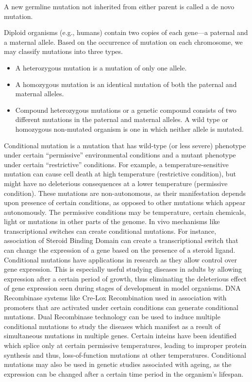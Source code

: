 A new germline mutation not inherited from either parent is called a de novo mutation.

Diploid organisms (e.g., humans) contain two copies of each gene---a paternal and a maternal allele. Based on the occurrence of mutation on each chromosome, we may classify mutations into three types.

\begin{itemize}
\tightlist
\item
  A heterozygous mutation is a mutation of only one allele.
\item
  A homozygous mutation is an identical mutation of both the paternal and maternal alleles.
\item
  Compound heterozygous mutations or a genetic compound consists of two different mutations in the paternal and maternal alleles.
  A wild type or homozygous non-mutated organism is one in which neither allele is mutated.
\end{itemize}

Conditional mutation is a mutation that has wild-type (or less severe) phenotype under certain ``permissive'' environmental conditions and a mutant phenotype under certain ``restrictive'' conditions. For example, a temperature-sensitive mutation can cause cell death at high temperature (restrictive condition), but might have no deleterious consequences at a lower temperature (permissive condition). These mutations are non-autonomous, as their manifestation depends upon presence of certain conditions, as opposed to other mutations which appear autonomously. The permissive conditions may be temperature, certain chemicals, light or mutations in other parts of the genome. In vivo mechanisms like transcriptional switches can create conditional mutations. For instance, association of Steroid Binding Domain can create a transcriptional switch that can change the expression of a gene based on the presence of a steroid ligand. Conditional mutations have applications in research as they allow control over gene expression. This is especially useful studying diseases in adults by allowing expression after a certain period of growth, thus eliminating the deleterious effect of gene expression seen during stages of development in model organisms. DNA Recombinase systems like Cre-Lox Recombination used in association with promoters that are activated under certain conditions can generate conditional mutations. Dual Recombinase technology can be used to induce multiple conditional mutations to study the diseases which manifest as a result of simultaneous mutations in multiple genes. Certain inteins have been identified which splice only at certain permissive temperatures, leading to improper protein synthesis and thus, loss-of-function mutations at other temperatures. Conditional mutations may also be used in genetic studies associated with ageing, as the expression can be changed after a certain time period in the organism's lifespan.

